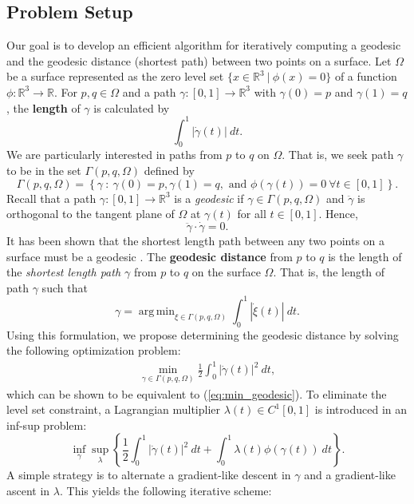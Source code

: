 \documentclass[12pt]{amsart}
\newcommand{\R}{\mathbb{R}}
\DeclareMathOperator*{\argmin}{arg\,min}
\theoremstyle{definition}
\theoremstyle{remark}
\numberwithin{equation}{section}
\numberwithin{equation}{section}
\begin{document}
\subsection{Problem Setup}\label{sec:prob-setup} 
Our goal is to develop an efficient algorithm for iteratively computing a geodesic and the geodesic distance (shortest path) between two points on a surface.  
Let $\Omega$ be a surface represented as the zero level set $\{x\in\R^3~|~ \phi(x)=0\}$ of a function $\phi:\R^3 \to \R$.  
For $p,q\in \Omega$ and a path $\gamma:[0,1]\to \R^3$ with $\gamma(0) = p$ and $\gamma(1) = q$, the \textbf{length} of $\gamma$ is calculated by 
\[
\int_0^1 |\dot \gamma(t)|~dt.
\]
We are particularly interested in paths from $p$ to $q$ on $\Omega$. That is, we seek path $\gamma$ to be in the set  $\Gamma(p,q,\Omega)$ defined by
\[
\Gamma(p,q,\Omega) = \left\{\gamma~ :~ \gamma(0) = p, \gamma(1) = q, \text{ and } \phi(\gamma(t)) = 0 ~\forall t\in [0,1] \right\}.
\]
Recall that a path $\gamma:[0,1]\to \R^3$ is a \textit{geodesic} if $\gamma \in \Gamma(p,q,\Omega)$ and $\ddot{\gamma}$ is orthogonal to the tangent plane of $\Omega$ at $\gamma(t)$ for all $t\in[0,1]$. Hence,
\begin{equation}\label{geodesic}
    \ddot{\gamma}\cdot \dot{\gamma} = 0.
\end{equation}
It has been shown that the shortest length path between any two points on a surface must be a geodesic \cite{Pressley:2001}.
The \textbf{geodesic distance} from $p$ to $q$ is the length of the \textit{shortest length path $\gamma$} from $p$ to $q$ on the surface $\Omega$. That is, the length of path $\gamma$ such that 
\begin{equation}\label{eq:min_geodesic}
\gamma = \argmin_{\xi \in \Gamma(p,q,\Omega)}\int_0^1|\dot \xi (t)|~dt. 
\end{equation}
Using this formulation, we propose determining the geodesic distance by solving the following optimization problem:
\begin{align*}
\min_{\gamma \in \Gamma(p, q, \Omega)}  \frac{1}{2}\int_0^1|\dot \gamma(t)|^2~dt, 
\end{align*}
which can be shown to be equivalent to (\ref{eq:min_geodesic}). 
To eliminate the level set constraint, a Lagrangian multiplier $\lambda(t) \in C^1[0, 1]$ is introduced in an inf-sup problem:
\[\inf_{\gamma}\sup_{\lambda} \left\{  \frac{1}{2}\int_0^1 |\dot{\gamma}(t)|^2~dt  + \int_0^1 \lambda(t)\phi(\gamma(t))~dt\right\}.
\]
A simple strategy is to alternate a gradient-like descent in $\gamma$ and a gradient-like ascent in $\lambda$. This yields the following iterative scheme:   
\end{document}
